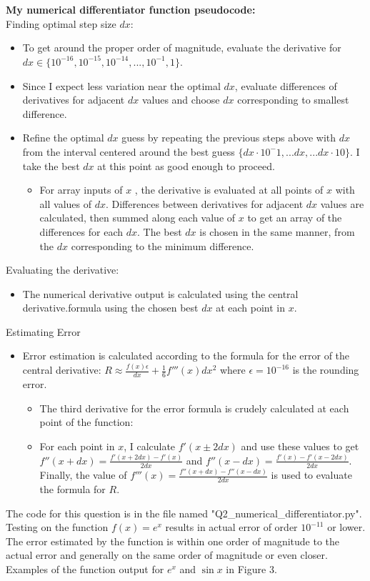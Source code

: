 \documentclass{article}
\newcommand{\<}[1]{\left\langle #1 \right\rangle }
\begin{document}
\section{}
\textbf{My numerical differentiator function pseudocode:}\\
Finding optimal step size $dx$:
\begin{itemize}
	\item To get around the proper order of magnitude, evaluate the derivative for $dx \in \{10^{-16}, 10^{-15}, 10^{-14}, ..., 10^{-1}, 1 \}$.
	\item Since I expect less variation near the optimal $dx$, evaluate differences of derivatives for adjacent $dx$ values and choose $dx$ corresponding to smallest difference.
	\item Refine the optimal $dx$ guess by repeating the previous steps above with $dx$ from the interval centered around the best guess $\{dx\cdot10^-1, ... dx, ... dx\cdot10\}$. I take the best $dx$ at this point as good enough to proceed.
	\begin{itemize}
		\item For array inputs of $x$ , the derivative is evaluated at all points of $x$ with all values of $dx$. Differences between derivatives for adjacent $dx$ values are calculated, then summed along each value of $x$ to get an array of the differences for each $dx$. The best $dx$ is chosen in the same manner, from the  $dx$ corresponding to the minimum difference.
	\end{itemize}
\end{itemize}
Evaluating the derivative:
\begin{itemize}
	\item The numerical derivative output is calculated using the central derivative.formula using the chosen best $dx$ at each point in $x$.
\end{itemize}
Estimating Error
\begin{itemize}
	\item Error estimation is calculated according to the formula for the error of the central derivative: $R \approx \frac{f(x)\epsilon}{dx} + \frac{1}{6}f'''(x)dx^2$ where $\epsilon = 10^{-16}$ is the rounding error.
	\begin{itemize}
		\item The third derivative for the error formula is crudely calculated at each point of the function:
		\item For each point in $x$, I calculate $f'(x\pm2dx)$ and use these values to get $f''(x+dx) = \frac{f'(x+2dx) - f'(x)}{2dx}$ and $f''(x-dx) = \frac{f'(x) - f'(x-2dx)}{2dx}$. Finally, the value of $f'''(x) = \frac{f''(x+dx) - f''(x-dx)}{2dx}$ is used to evaluate the formula for $R$.
	\end{itemize}
\end{itemize}
The code for this question is in the file named "Q2\_numerical\_differentiator.py". Testing on the function $f(x) = e^x$ results in actual error of order $10^{-11}$ or lower. The error estimated by the function is within one order of magnitude to the actual error and generally on the same order of magnitude or even closer. Examples of the function output for $e^x$ and $\sin{x}$ in Figure 3.
\end{document}
